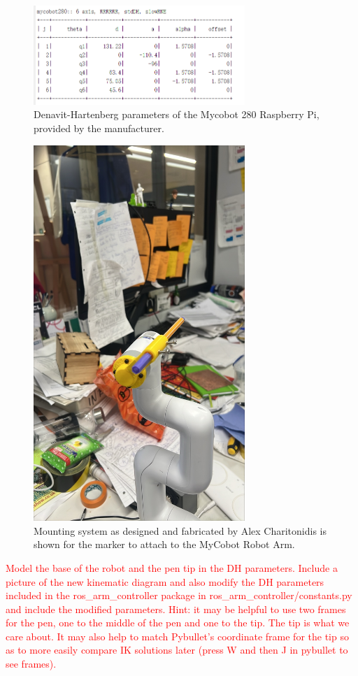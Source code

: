 \documentclass[11pt,a4paper]{article}
\begin{document}
\begin{figure}[h]
\includegraphics[width=8cm]{figures/dh_params_table.png}
\centering
\caption{Denavit-Hartenberg parameters of the Mycobot 280 Raspberry Pi, provided by the manufacturer.}
\label{fig:dh_table}
\end{figure}

\begin{figure}[h]
\includegraphics[width=8cm]{figures/marker_mount.jpeg}
\centering
\caption{Mounting system as designed and fabricated by Alex Charitonidis is shown for the marker to attach to the MyCobot Robot Arm.}
\label{fig:pen_mount}
\end{figure}

\textcolor{red}{Model the base of the robot and the pen tip in the DH parameters. Include a picture of the new kinematic diagram and also modify the DH parameters included in the ros\_arm\_controller package in ros\_arm\_controller/constants.py and include the modified parameters. Hint: it may be helpful to use two frames for the pen, one to the middle of the pen and one to the tip. The tip is what we care about. It may also help to match Pybullet's coordinate frame for the tip so as to more easily compare IK solutions later (press W and then J in pybullet to see frames).}
\end{document}
